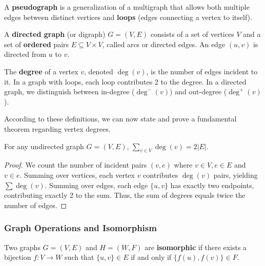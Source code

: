 \begin{definition}[Pseudograph]
A \textbf{pseudograph} is a generalization of a multigraph that allows both multiple edges between distinct vertices and \textbf{loops} (edges connecting a vertex to itself).
\end{definition}

\begin{definition}
A \textbf{directed graph} (or digraph) $G = (V, E)$ consists of a set of vertices $V$ and a set of \textbf{ordered} pairs $E \subseteq V \times V$, called arcs or directed edges. An edge $(u, v)$ is directed from $u$ to $v$.
\end{definition}

\begin{definition}[Degree]
The \textbf{degree} of a vertex $v$, denoted $\deg(v)$, is the number of edges incident to it. In a graph with loops, each loop contributes 2 to the degree. In a directed graph, we distinguish between in-degree ($\deg^-(v)$) and out-degree ($\deg^+(v)$).
\end{definition}

According to these definitions, we can now state and prove a fundamental theorem regarding vertex degrees.

\begin{theorem}
For any undirected graph $G = (V, E)$, $\sum_{v \in V} \deg(v) = 2|E|$.
\end{theorem}
\begin{proof}
We count the number of incident pairs $(v, e)$ where $v \in V, e \in E$ and $v \in e$.
Summing over vertices, each vertex $v$ contributes $\deg(v)$ pairs, yielding $\sum \deg(v)$.
Summing over edges, each edge $\{u, v\}$ has exactly two endpoints, contributing exactly 2 to the sum.
Thus, the sum of degrees equals twice the number of edges.
\end{proof}

\subsubsection{Graph Operations and Isomorphism}

\begin{definition}
Two graphs $G = (V, E)$ and $H = (W, F)$ are \textbf{isomorphic} if there exists a bijection $f: V \to W$ such that $\{u, v\} \in E$ if and only if $\{f(u), f(v)\} \in F$.
\end{definition}

